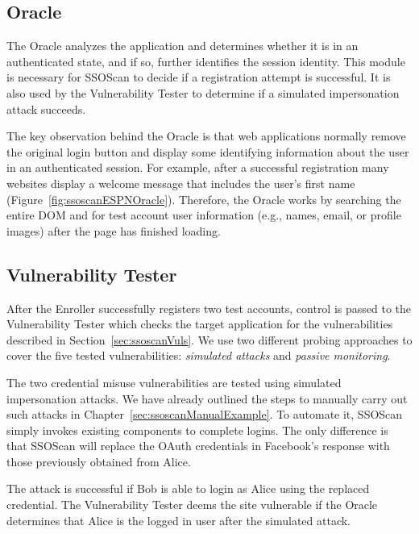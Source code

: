 \subsection{Oracle}
\label{sec:ssoscanDesignOracle}

The Oracle analyzes the application and determines whether it is in an authenticated state, and if so, further identifies the session identity.  This module is necessary for SSOScan to decide if a registration attempt is successful.  It is also used by the Vulnerability Tester to determine if a simulated impersonation attack succeeds.

The key observation behind the Oracle is that web applications normally remove the original login button and display some identifying information about the user in an authenticated session.  For example, after a successful registration many websites display a welcome message that includes the user's first name (Figure~\ref{fig:ssoscanESPNOracle}).  Therefore, the Oracle works by searching the entire DOM and  for test account user information (e.g., names, email, or profile images) after the page has finished loading.

\subsection{Vulnerability Tester}
\label{sec:ssoscanDesignVT}

After the Enroller successfully registers two test accounts, control is passed to the Vulnerability Tester which checks the target application for the vulnerabilities described in Section~\ref{sec:ssoscanVuls}.  We use two different probing approaches to cover the five tested vulnerabilities: \emph{simulated attacks} and \emph{passive monitoring}.

 The two credential misuse vulnerabilities are tested using simulated impersonation attacks.  We have already outlined the steps to manually carry out such attacks in Chapter~\ref{sec:ssoscanManualExample}.  To automate it, SSOScan simply invokes existing components to complete logins.  The only difference is that SSOScan will replace the OAuth credentials in Facebook's response with those previously obtained from Alice.

The attack is successful if Bob is able to login as Alice using the replaced credential.  The Vulnerability Tester deems the site vulnerable if the Oracle determines that Alice is the logged in user after the simulated attack.

